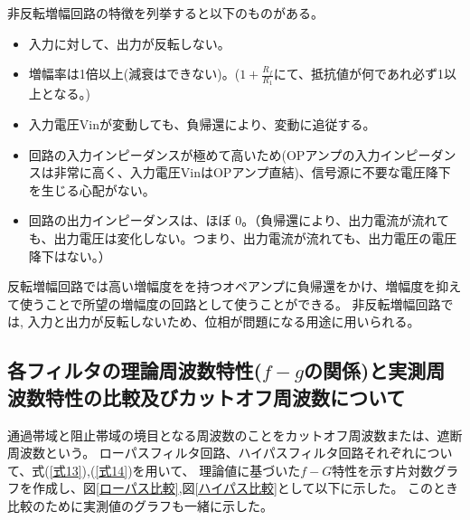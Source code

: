 \documentclass[a4paper,11pt,uplatex]{jsarticle}
\begin{document}
非反転増幅回路の特徴を列挙すると以下のものがある。
\begin{itemize}
	\item 入力に対して、出力が反転しない。
	\item 増幅率は1倍以上(減衰はできない)。($1 + \frac{R_f}{R_1}$にて、抵抗値が何であれ必ず1以上となる。)
	\item 入力電圧Vinが変動しても、負帰還により、変動に追従する。
	\item 回路の入力インピーダンスが極めて高いため(OPアンプの入力インピーダンスは非常に高く、入力電圧VinはOPアンプ直結)、信号源に不要な電圧降下を生じる心配がない。
	\item 回路の出力インピーダンスは、ほぼ 0。（負帰還により、出力電流が流れても、出力電圧は変化しない。つまり、出力電流が流れても、出力電圧の電圧降下はない。）
\end{itemize}

反転増幅回路では高い増幅度をを持つオペアンプに負帰還をかけ、増幅度を抑えて使うことで所望の増幅度の回路として使うことができる。
非反転増幅回路では, 入力と出力が反転しないため、位相が問題になる用途に用いられる。

\subsection{各フィルタの理論周波数特性($f-g$の関係)と実測周波数特性の比較及びカットオフ周波数について}
通過帯域と阻止帯域の境目となる周波数のことをカットオフ周波数または、遮断周波数という。
ローパスフィルタ回路、ハイパスフィルタ回路それぞれについて、式(\ref{式13}),(\ref{式14})を用いて、
理論値に基づいた$f−G$特性を示す片対数グラフを作成し、図\ref{ローパス比較},図\ref{ハイパス比較}として以下に示した。
このとき比較のために実測値のグラフも一緒に示した。
\end{document}
